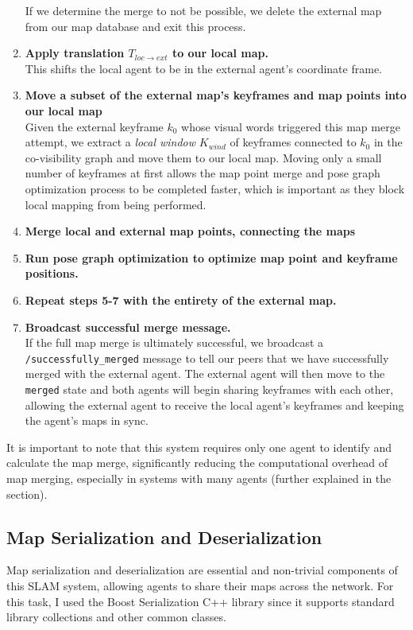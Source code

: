 \begin{enumerate}
          If we determine the merge to not be possible, we delete the external map from our map database and exit this process.
    \item \textbf{Apply translation $T_{loc \rightarrow ext}$ to our local map.} \\
          This shifts the local agent to be in the external agent's coordinate frame.
    \item \textbf{Move a subset of the external map's keyframes and map points into our local map} \\
          Given the external keyframe $k_0$ whose visual words triggered this map merge attempt, we extract a \textit{local window} $K_{wind}$ of keyframes connected to $k_0$ in the co-visibility graph and move them to our local map. Moving only a small number of keyframes at first allows the map point merge and pose graph optimization process to be completed faster, which is important as they block local mapping from being performed.
    \item \textbf{Merge local and external map points, connecting the maps}
    \item \textbf{Run pose graph optimization to optimize map point and keyframe positions.}
    \item \textbf{Repeat steps 5-7 with the entirety of the external map.}
    \item \textbf{Broadcast successful merge message.} \\
          If the full map merge is ultimately successful, we broadcast a \texttt{/successfully\_merged} message to tell our peers that we have successfully merged with the external agent. The external agent will then move to the \texttt{merged} state and both agents will begin sharing keyframes with each other, allowing the external agent to receive the local agent's keyframes and keeping the agent's maps in sync.

\end{enumerate}

It is important to note that this system requires only one agent to identify and calculate the map merge, significantly reducing the computational overhead of map merging, especially in systems with many agents (further explained in the  section).


\subsection{Map Serialization and Deserialization}
\label{sec:map-serialization-and-deserialization}
Map serialization and deserialization are essential and non-trivial components of this SLAM system, allowing agents to share their maps across the network. For this task, I used the Boost \autocite{boostLibrary} Serialization C++ library since it supports standard library collections and other common classes.

